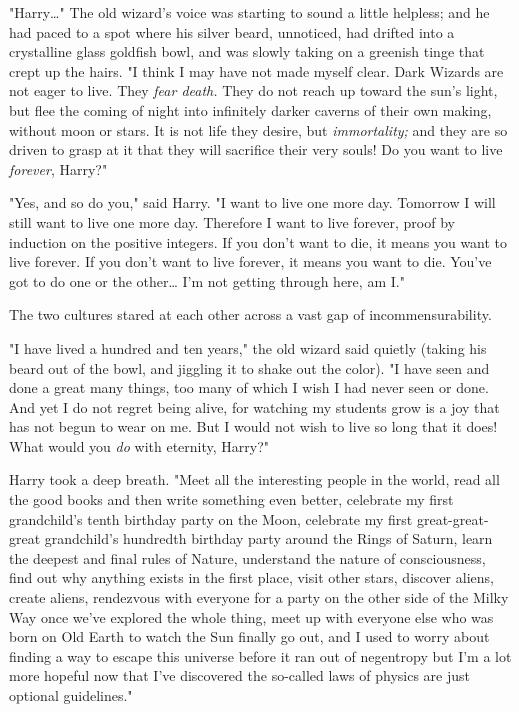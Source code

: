 "Harry{\ldots}" The old wizard's voice was starting to sound a little helpless; 
and he had paced to a spot where his silver beard, unnoticed, had drifted into 
a crystalline glass goldfish bowl, and was slowly taking on a greenish tinge 
that crept up the hairs. "I think I may have not made myself clear. Dark 
Wizards are not eager to live. They \emph{fear death.} They do not reach up 
toward the sun's light, but flee the coming of night into infinitely darker 
caverns of their own making, without moon or stars. It is not life they desire, 
but \emph{immortality;} and they are so driven to grasp at it that they will 
sacrifice their very souls! Do you want to live \emph{forever}, Harry?"

"Yes, and so do you," said Harry. "I want to live one more day. Tomorrow I will 
still want to live one more day. Therefore I want to live forever, proof by 
induction on the positive integers. If you don't want to die, it means you want 
to live forever. If you don't want to live forever, it means you want to die. 
You've got to do one or the other{\ldots} I'm not getting through here, am I."

The two cultures stared at each other across a vast gap of incommensurability.

"I have lived a hundred and ten years," the old wizard said quietly (taking his 
beard out of the bowl, and jiggling it to shake out the color). "I have seen 
and done a great many things, too many of which I wish I had never seen or 
done. And yet I do not regret being alive, for watching my students grow is a 
joy that has not begun to wear on me. But I would not wish to live so long that 
it does! What would you \emph{do} with eternity, Harry?"

Harry took a deep breath. "Meet all the interesting people in the world, read 
all the good books and then write something even better, celebrate my first 
grandchild's tenth birthday party on the Moon, celebrate my first 
great-great-great grandchild's hundredth birthday party around the Rings of 
Saturn, learn the deepest and final rules of Nature, understand the nature of 
consciousness, find out why anything exists in the first place, visit other 
stars, discover aliens, create aliens, rendezvous with everyone for a party on 
the other side of the Milky Way once we've explored the whole thing, meet up 
with everyone else who was born on Old Earth to watch the Sun finally go out, 
and I used to worry about finding a way to escape this universe before it ran 
out of negentropy but I'm a lot more hopeful now that I've discovered the 
so-called laws of physics are just optional guidelines."

